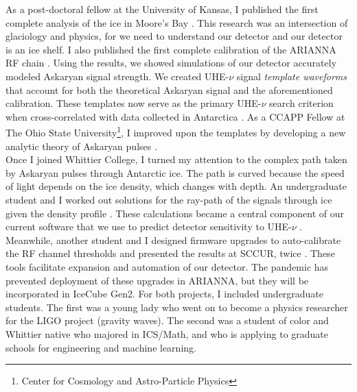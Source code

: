 \documentclass[../../main.tex]{subfiles}
\begin{document}
As a post-doctoral fellow at the University of Kansas, I published the first complete analysis of the ice in Moore's Bay \cite{10.3189/2015jog14j214}.  This research was an intersection of glaciology and physics, for we need to understand our detector and our detector is an ice shelf.  I also published the first complete calibration of the ARIANNA RF chain \cite{10.1016/j.astropartphys.2014.09.002}. Using the results, we showed simulations of our detector accurately modeled Askaryan signal strength.  We created UHE-$\nu$ signal \textit{template waveforms} that account for both the theoretical Askaryan signal and the aforementioned calibration.  These templates now serve as the primary UHE-$\nu$ search criterion when cross-correlated with data collected in Antarctica \cite{10.1016/j.astropartphys.2015.04.002} \cite{4_5}.  As a CCAPP Fellow at The Ohio State University\footnote{Center for Cosmology and Astro-Particle Physics}, I improved upon the templates by developing a new analytic theory of Askaryan pulses \cite{10.1016/j.astropartphys.2017.03.008}.
\\
\vspace{0.25cm}
Once I joined Whittier College, I turned my attention to the complex path taken by Askaryan pulses through Antarctic ice.  The path is curved because the speed of light depends on the ice density, which changes with depth.  An undergraduate student and I worked out solutions for the ray-path of the signals through ice given the density profile \cite{Barwick:2018497}.  These calculations became a central component of our current software that we use to predict detector sensitivity to UHE-$\nu$ \cite{10.1140/epjc/s10052-020-7612-8} \cite{10.1140/epjc/s10052-019-6971-5}.  Meanwhile, another student and I designed firmware upgrades to auto-calibrate the RF channel thresholds and presented the results at SCCUR, twice \cite{sccur1} \cite{sccur2}.  These tools facilitate expansion and automation of our detector.  The pandemic has prevented deployment of these upgrades in ARIANNA, but they will be incorporated in IceCube Gen2.  For both projects, I included undergraduate students.  The first was a young lady who went on to become a physics researcher for the LIGO project (gravity waves).  The second was a student of color and Whittier native who majored in ICS/Math, and who is applying to graduate schools for engineering and machine learning.
\\
\vspace{0.25cm}
\end{document}
